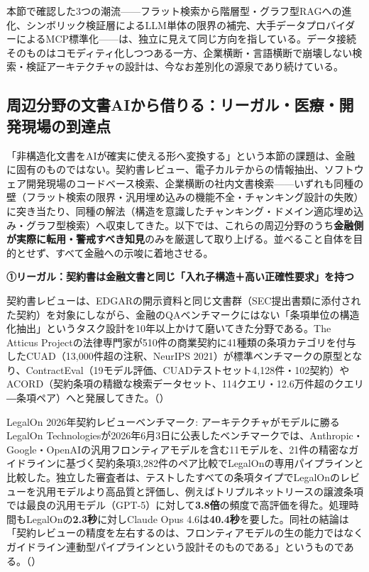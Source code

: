 本節で確認した3つの潮流——フラット検索から階層型・グラフ型RAGへの進化、シンボリック検証層によるLLM単体の限界の補完、大手データプロバイダーによるMCP標準化——は、独立に見えて同じ方向を指している。データ接続そのものはコモディティ化しつつある一方、企業横断・言語横断で崩壊しない検索・検証アーキテクチャの設計は、今なお差別化の源泉であり続けている。

\subsection{周辺分野の文書AIから借りる：リーガル・医療・開発現場の到達点}

「非構造化文書をAIが確実に使える形へ変換する」という本節の課題は、金融に固有のものではない。契約書レビュー、電子カルテからの情報抽出、ソフトウェア開発現場のコードベース検索、企業横断の社内文書検索——いずれも同種の壁（フラット検索の限界・汎用埋め込みの機能不全・チャンキング設計の失敗）に突き当たり、同種の解法（構造を意識したチャンキング・ドメイン適応埋め込み・グラフ型検索）へ収束してきた。以下では、これらの周辺分野のうち\textbf{金融側が実際に転用・警戒すべき知見}のみを厳選して取り上げる。並べること自体を目的とせず、すべて金融への示唆に着地させる。

\textbf{①リーガル：契約書は金融文書と同じ「入れ子構造＋高い正確性要求」を持つ}

契約書レビューは、EDGARの開示資料と同じ文書群（SEC提出書類に添付された契約）を対象にしながら、金融のQAベンチマークにはない「条項単位の構造化抽出」というタスク設計を10年以上かけて磨いてきた分野である。The Atticus Projectの法律専門家が510件の商業契約に41種類の条項カテゴリを付与したCUAD（13,000件超の注釈、NeurIPS 2021）が標準ベンチマークの原型となり、ContractEval（19モデル評価、CUADテストセット4,128件・102契約）やACORD（契約条項の精緻な検索データセット、114クエリ・12.6万件超のクエリ―条項ペア）へと発展してきた。（\cite{y02cuad2021,y02contracteval2025,y02acord2025}）

\begin{casestudy}{LegalOn 2026年契約レビューベンチマーク: アーキテクチャがモデルに勝る}
LegalOn Technologiesが2026年6月3日に公表したベンチマークでは、Anthropic・Google・OpenAIの汎用フロンティアモデルを含む11モデルを、21件の精密なガイドラインに基づく契約条項3,282件のペア比較でLegalOnの専用パイプラインと比較した。独立した審査者は、テストしたすべての条項タイプでLegalOnのレビューを汎用モデルより高品質と評価し、例えばトリプルネットリースの譲渡条項では最良の汎用モデル（GPT-5）に対して\textbf{3.8倍}の頻度で高評価を得た。処理時間もLegalOnの\textbf{2.3秒}に対しClaude Opus 4.6は\textbf{40.4秒}を要した。同社の結論は「契約レビューの精度を左右するのは、フロンティアモデルの生の能力ではなくガイドライン連動型パイプラインという設計そのものである」というものである。（\cite{y02legalonbench2026}）
\end{casestudy}


